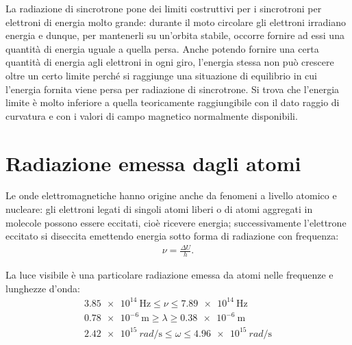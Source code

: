 La radiazione di sincrotrone pone dei limiti costruttivi per i sincrotroni per elettroni di energia molto grande: durante il moto circolare gli elettroni irradiano energia e dunque, per mantenerli su un'orbita stabile, occorre fornire ad essi una quantità di energia uguale a quella persa. Anche potendo fornire una certa quantità di energia agli elettroni in ogni giro, l'energia stessa non può crescere oltre un certo limite perché si raggiunge una situazione di equilibrio in cui l'energia fornita viene persa per radiazione di sincrotrone. Si trova che l'energia limite è molto inferiore a quella teoricamente raggiungibile con il dato raggio di curvatura e con i valori di campo magnetico normalmente disponibili.

\section{Radiazione emessa dagli atomi}%
Le onde elettromagnetiche hanno origine anche da fenomeni a livello atomico e nucleare: gli elettroni legati di singoli atomi liberi o di atomi aggregati in molecole possono essere eccitati, cioè ricevere energia; successivamente l'elettrone eccitato si diseccita emettendo energia sotto forma di radiazione \elettrom con frequenza:
\begin{equation}\begin{split}
\nu=\frac{\Delta U}{h}.
\end{split}\end{equation}

La luce visibile è una particolare radiazione \elettrom emessa da atomi nelle frequenze e lunghezze d'onda:
\begin{equation}\begin{split}
\SI{3.85e14}{\hertz}\le\nu\le\SI{7.89e14}{\hertz}\\
\SI{0.78e-6}{\metre}\ge\lambda\ge\SI{0.38e-6}{\metre}\\
\SI{2.42e15}{rad\per\second}\le\omega\le\SI{4.96e15}{rad\per\second}
\end{split}\end{equation}

